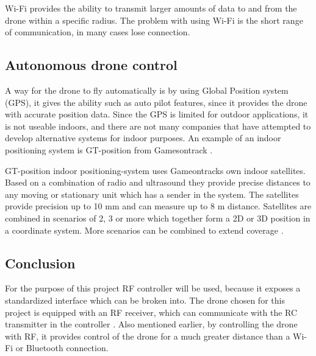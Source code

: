 Wi-Fi provides the ability to transmit larger amounts of data to and from the drone within a specific radius. The problem with using Wi-Fi is the short range of communication, in many cases lose connection. 

\subsection*{Autonomous drone control}
A way for the drone to fly automatically is by using Global Position system (GPS), it gives the ability such as auto pilot features, since it provides the drone with accurate position data.
Since the GPS is limited for outdoor applications, it is not useable indoors, and there are not many companies that have attempted to develop alternative systems for indoor purposes. An example of an indoor positioning system is GT-position from Gamesontrack \cite{gt-position}. 

GT-position indoor positioning-system uses Gameontracks own indoor satellites.
Based on a combination of radio and ultrasound they provide precise distances to any moving or stationary unit which has a sender in the system.
The satellites provide precision up to 10 mm and can measure up to 8 m distance. Satellites are combined in scenarios of 2, 3 or more which together form a 2D or 3D position in a coordinate system. More scenarios can be combined to extend coverage \cite{gt-position}.

\subsection*{Conclusion} 
For the purpose of this project RF controller will be used, because it exposes a standardized interface which can be broken into. The drone chosen for this project is equipped with an RF receiver, which can communicate with the RC transmitter in the controller \cite{Control}. Also mentioned earlier, by controlling the drone with RF, it provides control of the drone for a much greater distance than a Wi-Fi or Bluetooth connection.











